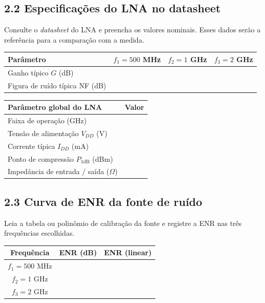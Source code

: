 \documentclass[11pt,a4paper]{article}
\begin{document}
\subsection*{2.2 Especificações do LNA no datasheet}

Consulte o \emph{datasheet} do LNA e preencha os valores nominais. Esses dados serão a referência para a comparação com a medida.

{\renewcommand{\arraystretch}{1.5}
\begin{center}
\begin{tabular}{|l|c|c|c|}
\hline
\textbf{Parâmetro} & \textbf{$f_1 = 500$ MHz} & \textbf{$f_2 = 1$ GHz} & \textbf{$f_3 = 2$ GHz} \\
\hline
Ganho típico $G$ (dB)              & & & \\
\hline
Figura de ruído típica NF (dB)     & & & \\
\hline
\end{tabular}

\vspace{0.4em}

\begin{tabular}{|l|c|}
\hline
\textbf{Parâmetro global do LNA} & \textbf{Valor} \\
\hline
Faixa de operação (GHz)            & \\
\hline
Tensão de alimentação $V_{DD}$ (V) & \\
\hline
Corrente típica $I_{DD}$ (mA)      & \\
\hline
Ponto de compressão $P_{1\text{dB}}$ (dBm) & \\
\hline
Impedância de entrada / saída ($\Omega$) & \\
\hline
\end{tabular}
\end{center}
}

\subsection*{2.3 Curva de ENR da fonte de ruído}

Leia a tabela ou polinômio de calibração da fonte e registre a ENR nas três frequências escolhidas.

{\renewcommand{\arraystretch}{1.5}
\begin{center}
\begin{tabular}{|c|c|c|}
\hline
\textbf{Frequência} & \textbf{ENR (dB)} & \textbf{ENR (linear)} \\
\hline
$f_1 = 500$ MHz & & \\
\hline
$f_2 = 1$ GHz & & \\
\hline
$f_3 = 2$ GHz & & \\
\hline
\end{tabular}
\end{center}
}
\end{document}
